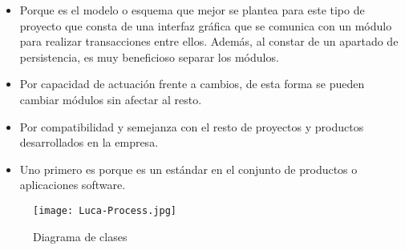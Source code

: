 		\begin{itemize}
			\item Porque es el modelo o esquema que mejor se plantea para este tipo de proyecto que consta de una interfaz gráfica que se comunica con un módulo para realizar transacciones entre ellos. Además, al constar de un apartado de persistencia, es muy beneficioso separar los módulos.
			\item Por capacidad de actuación frente a cambios, de esta forma se pueden cambiar módulos sin afectar al resto.
			\item Por compatibilidad y semejanza con el resto de proyectos y productos desarrollados en la empresa.
			\item Uno primero es porque es un estándar en el conjunto de productos o aplicaciones software.
		\end{itemize} 
		
		\begin{figure}[H]
			\centering
			\texttt{[image: Luca-Process.jpg]}
			\caption{Diagrama de clases}\label{fig:Luca-Process}
		\end{figure}
	